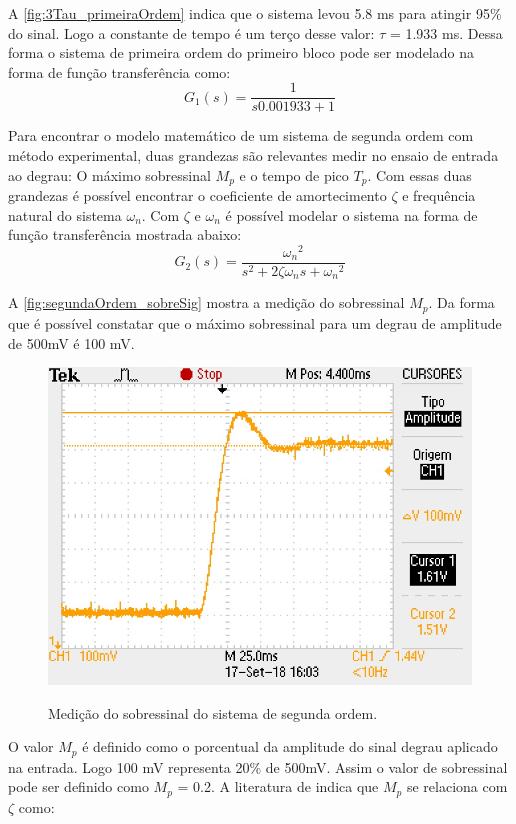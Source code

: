 \documentclass[
	article,			%
	11pt,				%
	oneside,			%
	a4paper,			%
	english,			%
	brazil,				%
	sumario=tradicional
	]{abntex2}
\begin{document}
A \autoref{fig:3Tau_primeiraOrdem} indica que o sistema levou 5.8 ms para atingir 95\% do sinal. 
Logo a constante de tempo é um terço desse valor: $\tau$ = 1.933 ms. 
Dessa forma o sistema de primeira ordem do primeiro bloco pode ser modelado na forma de função transferência como:
$$
	G_{1}(s) = \frac{1}{s0.001933 + 1}
$$

\pagebreak

Para encontrar o modelo matemático de um sistema de segunda ordem com método experimental, duas grandezas são relevantes medir no ensaio de entrada ao degrau: O máximo sobressinal $M_{p}$ e o tempo de pico $T_{p}$.
Com essas duas grandezas é possível encontrar o coeficiente de amortecimento $\zeta$ e frequência natural do sistema $\omega_n$. Com $\zeta$ e $\omega_n$ é possível modelar o sistema na forma de função transferência mostrada abaixo\cite{Ogata2014}:
$$
	G_{2}(s) = \frac{{\omega_n}^2}{s^2 + 2\zeta\omega_ns + {\omega_n}^2}
$$

A \autoref{fig:segundaOrdem_sobreSig} mostra a medição do sobressinal $M_{p}$. Da forma que é possível constatar que o máximo sobressinal para um degrau de amplitude de 500mV é 100 mV.

\begin{figure}[htb!]
	\centering
	\caption{Medição do sobressinal do sistema de segunda ordem.}
	\includegraphics[scale=1.4]{./img/segundaOrdem_sobreSig.JPG}
	\label{fig:segundaOrdem_sobreSig}
\end{figure}

O valor $M_{p}$ é definido como o porcentual da amplitude do sinal degrau aplicado na entrada. Logo 100 mV representa 20\% de 500mV. Assim o valor de sobressinal pode ser definido como $M_{p}$ = 0.2. 
A literatura de  indica que $M_{p}$ se relaciona com $\zeta$ como:
\end{document}

